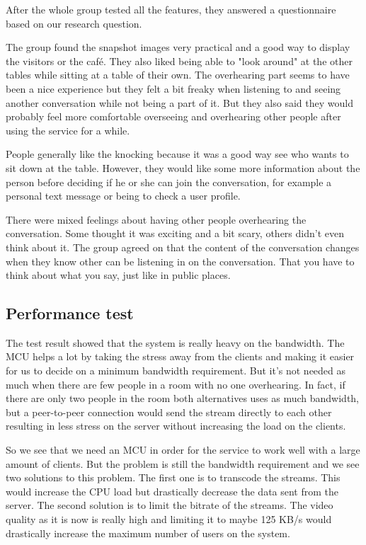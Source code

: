 \documentclass[12pt, titlepage]{article}
\begin{document}
After the whole group tested all the features, they answered a questionnaire based on our research question.

The group found the snapshot images very practical and a good way to display the visitors or the café. They also liked being able to "look around" at the other tables while sitting at a table of their own. The overhearing part seems to have been a nice experience but they felt a bit freaky when listening to and seeing another conversation while not being a part of it. But they also said they would probably feel more comfortable overseeing and overhearing other people after using the service for a while.

People generally like the knocking because it was a good way see who wants to sit down at the table. However, they would like some more information about the person before deciding if he or she can join the conversation, for example a personal text message or being to check a user profile.

There were mixed feelings about having other people overhearing the conversation. Some thought it was exciting and a bit scary, others didn’t even think about it. The group agreed on that the content of the conversation changes when they know other can be listening in on the conversation. That you have to think about what you say, just like in public places.

\subsection{Performance test}
The test result showed that the system is really heavy on the bandwidth. The MCU helps a lot by taking the stress away from the clients and making it easier for us to decide on a minimum bandwidth requirement. But it's not needed as much when there are few people in a room with no one overhearing. In fact, if there are only two people in the room both alternatives uses as much bandwidth, but a peer-to-peer connection would send the stream directly to each other resulting in less stress on the server without increasing the load on the clients.

So we see that we need an MCU in order for the service to work well with a large amount of clients. But the problem is still the bandwidth requirement and we see two solutions to this problem. The first one is to transcode the streams. This would increase the CPU load but drastically decrease the data sent from the server. The second solution is to limit the bitrate of the streams. The video quality as it is now is really high and limiting it to maybe 125 KB/s would drastically increase the maximum number of users on the system.
\end{document}
